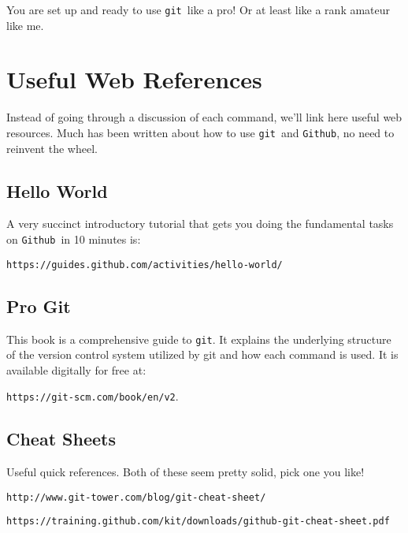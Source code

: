 \documentclass[14pt]{amsart}
\newcommand{\git}{{\texttt{git}}}
\newcommand{\github}{{\texttt{Github}}}
\begin{document}
You are set up and ready to use \git\ like a pro!  Or at least like a rank amateur like me.

\section{Useful Web References}

Instead of going through a discussion of each command, we'll link here useful web resources. Much has been written about how to use \git\ and \github, no need to reinvent the wheel.

\subsection{Hello World}

A very succinct introductory tutorial that gets you doing the fundamental tasks on \github\ in 10 minutes is: 

\texttt{https://guides.github.com/activities/hello-world/}

\subsection{Pro Git}

This book is a comprehensive guide to \git.  It explains the underlying structure of the version control system utilized by git and how each command is used.  It is available digitally for free at: 

\texttt{https://git-scm.com/book/en/v2}.

\subsection{Cheat Sheets}

Useful quick references. Both of these seem pretty solid, pick one you like!

\texttt{http://www.git-tower.com/blog/git-cheat-sheet/}

\texttt{https://training.github.com/kit/downloads/github-git-cheat-sheet.pdf}
\end{document}
